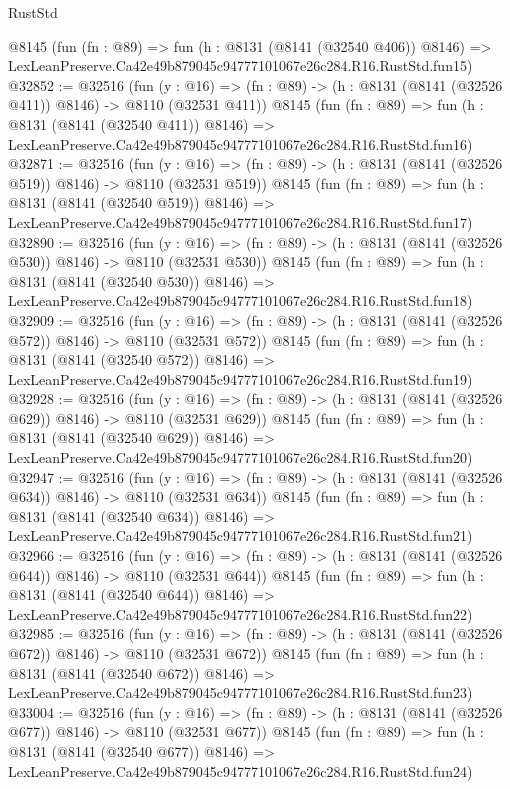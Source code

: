 \begin{lexlean}{RustStd}
\begin{coremodule}
    @8145
    (fun (fn : @89) =>
    fun (h : @8131 (@8141 (@32540 @406)) @8146) =>
    LexLeanPreserve.Ca42e49b879045c94777101067e26c284.R16.RustStd.fun15)
@32852 := @32516
    (fun (y : @16) => (fn : @89) -> (h : @8131 (@8141 (@32526 @411)) @8146) -> @8110 (@32531 @411))
    @8145
    (fun (fn : @89) =>
    fun (h : @8131 (@8141 (@32540 @411)) @8146) =>
    LexLeanPreserve.Ca42e49b879045c94777101067e26c284.R16.RustStd.fun16)
@32871 := @32516
    (fun (y : @16) => (fn : @89) -> (h : @8131 (@8141 (@32526 @519)) @8146) -> @8110 (@32531 @519))
    @8145
    (fun (fn : @89) =>
    fun (h : @8131 (@8141 (@32540 @519)) @8146) =>
    LexLeanPreserve.Ca42e49b879045c94777101067e26c284.R16.RustStd.fun17)
@32890 := @32516
    (fun (y : @16) => (fn : @89) -> (h : @8131 (@8141 (@32526 @530)) @8146) -> @8110 (@32531 @530))
    @8145
    (fun (fn : @89) =>
    fun (h : @8131 (@8141 (@32540 @530)) @8146) =>
    LexLeanPreserve.Ca42e49b879045c94777101067e26c284.R16.RustStd.fun18)
@32909 := @32516
    (fun (y : @16) => (fn : @89) -> (h : @8131 (@8141 (@32526 @572)) @8146) -> @8110 (@32531 @572))
    @8145
    (fun (fn : @89) =>
    fun (h : @8131 (@8141 (@32540 @572)) @8146) =>
    LexLeanPreserve.Ca42e49b879045c94777101067e26c284.R16.RustStd.fun19)
@32928 := @32516
    (fun (y : @16) => (fn : @89) -> (h : @8131 (@8141 (@32526 @629)) @8146) -> @8110 (@32531 @629))
    @8145
    (fun (fn : @89) =>
    fun (h : @8131 (@8141 (@32540 @629)) @8146) =>
    LexLeanPreserve.Ca42e49b879045c94777101067e26c284.R16.RustStd.fun20)
@32947 := @32516
    (fun (y : @16) => (fn : @89) -> (h : @8131 (@8141 (@32526 @634)) @8146) -> @8110 (@32531 @634))
    @8145
    (fun (fn : @89) =>
    fun (h : @8131 (@8141 (@32540 @634)) @8146) =>
    LexLeanPreserve.Ca42e49b879045c94777101067e26c284.R16.RustStd.fun21)
@32966 := @32516
    (fun (y : @16) => (fn : @89) -> (h : @8131 (@8141 (@32526 @644)) @8146) -> @8110 (@32531 @644))
    @8145
    (fun (fn : @89) =>
    fun (h : @8131 (@8141 (@32540 @644)) @8146) =>
    LexLeanPreserve.Ca42e49b879045c94777101067e26c284.R16.RustStd.fun22)
@32985 := @32516
    (fun (y : @16) => (fn : @89) -> (h : @8131 (@8141 (@32526 @672)) @8146) -> @8110 (@32531 @672))
    @8145
    (fun (fn : @89) =>
    fun (h : @8131 (@8141 (@32540 @672)) @8146) =>
    LexLeanPreserve.Ca42e49b879045c94777101067e26c284.R16.RustStd.fun23)
@33004 := @32516
    (fun (y : @16) => (fn : @89) -> (h : @8131 (@8141 (@32526 @677)) @8146) -> @8110 (@32531 @677))
    @8145
    (fun (fn : @89) =>
    fun (h : @8131 (@8141 (@32540 @677)) @8146) =>
    LexLeanPreserve.Ca42e49b879045c94777101067e26c284.R16.RustStd.fun24)

\end{coremodule}
\end{lexlean}

